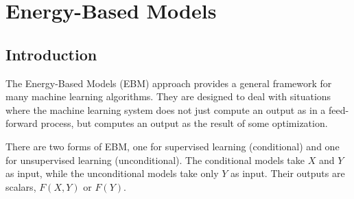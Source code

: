 \chapter{Energy-Based Models}

\section{Introduction}

The Energy-Based Models (EBM) approach provides a general framework for many machine learning algorithms. 
They are designed to deal with situations where the machine learning system does not just compute an output as in a feed-forward process, but computes an output as the result of some optimization.

There are two forms of EBM, one for supervised learning (conditional) and one for unsupervised learning (unconditional). 
The conditional models take $X$ and $Y$ as input, while the unconditional models take only $Y$ as input. 
Their outputs are scalars, $F(X,Y)$ or $F(Y)$.


